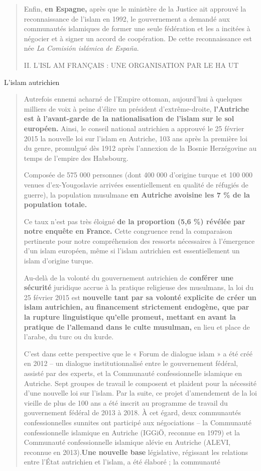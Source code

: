 \begin{quote}
Enfin, \textbf{en Espagne,} après que le ministère de la Justice ait
approuvé la reconnaissance de l'islam en 1992, le gouvernement a demandé
aux communautés islamiques de former une seule fédération et les a
incitées à négocier et à signer un accord de coopération. De cette
reconnaissance est née \emph{La Comisión islámica de España}.

II. L'ISL AM FRANÇAIS : UNE ORGANISATION PAR LE HA UT
\end{quote}

L'islam autrichien

\begin{quote}
Autrefois ennemi acharné de l'Empire ottoman, aujourd'hui à quelques
milliers de voix à peine d'élire un président d'extrême-droite,
\textbf{l'Autriche est à l'avant-garde de la nationalisation de l'islam
sur le sol européen.} Ainsi, le conseil national autrichien a approuvé
le 25 février 2015 la nouvelle loi sur l'islam en Autriche, 103 ans
après la première loi du genre, promulgué dès 1912 après l'annexion de
la Bosnie Herzégovine au temps de l'empire des Habsbourg.

Composée de 575 000 personnes (dont 400 000 d'origine turque et 100 000
venues d'ex-Yougoslavie arrivées essentiellement en qualité de réfugiés
de guerre), la population musulmane \textbf{en Autriche avoisine les 7
\% de la population totale.}

Ce taux n'est pas très éloigné \textbf{de la proportion (5,6 \%) révélée
par notre enquête en France.} Cette congruence rend la comparaison
pertinente pour notre compréhension des ressorts nécessaires à
l'émergence d'un islam européen, même si l'islam autrichien est
essentiellement un islam d'origine turque.

Au-delà de la volonté du gouvernement autrichien de \textbf{conférer une
sécurité} juridique accrue à la pratique religieuse des musulmans, la
loi du 25 février 2015 est \textbf{nouvelle tant par sa volonté
explicite de créer un islam autrichien, au financement strictement
endogène, que par la rupture linguistique qu'elle promeut, mettant en
avant la pratique de l'allemand dans le culte musulman,} en lieu et
place de l'arabe, du turc ou du kurde.

C'est dans cette perspective que le « Forum de dialogue islam » a été
créé en 2012 -- un dialogue institutionnalisé entre le gouvernement
fédéral, assisté par des experts, et la Communauté confessionnelle
islamique en Autriche. Sept groupes de travail le composent et plaident
pour la nécessité d'une nouvelle loi sur l'islam. Par la suite, ce
projet d'amendement de la loi vieille de plus de 100 ans a été inscrit
au programme de travail du gouvernement fédéral de 2013 à 2018. À cet
égard, deux communautés confessionnelles sunnites ont participé aux
négociations -- la Communauté confessionnelle islamique en Autriche
(IGGiÖ, reconnue en 1979) et la Communauté confessionnelle islamique
alévie en Autriche (ALEVI, reconnue en 2013).\textbf{Une nouvelle base}
législative, régissant les relations entre l'État autrichien et l'islam,
a été élaboré ; la communauté


\end{quote}
